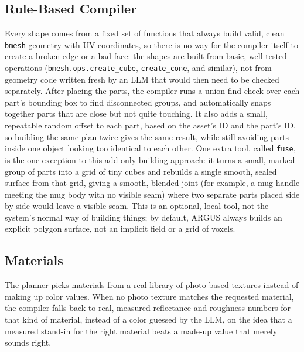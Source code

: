 \documentclass[conference]{IEEEtran}
\begin{document}
\subsection{Rule-Based Compiler}
Every shape comes from a fixed set of functions that always build valid, clean \texttt{bmesh} geometry with UV coordinates, so there is no way for the compiler itself to create a broken edge or a bad face: the shapes are built from basic, well-tested operations (\texttt{bmesh.ops.create\_cube}, \texttt{create\_cone}, and similar), not from geometry code written fresh by an LLM that would then need to be checked separately. After placing the parts, the compiler runs a union-find check over each part's bounding box to find disconnected groups, and automatically snaps together parts that are close but not quite touching. It also adds a small, repeatable random offset to each part, based on the asset's ID and the part's ID, so building the same plan twice gives the same result, while still avoiding parts inside one object looking too identical to each other. One extra tool, called \texttt{fuse}, is the one exception to this add-only building approach: it turns a small, marked group of parts into a grid of tiny cubes and rebuilds a single smooth, sealed surface from that grid, giving a smooth, blended joint (for example, a mug handle meeting the mug body with no visible seam) where two separate parts placed side by side would leave a visible seam. This is an optional, local tool, not the system's normal way of building things; by default, ARGUS always builds an explicit polygon surface, not an implicit field or a grid of voxels.

\subsection{Materials}
The planner picks materials from a real library of photo-based textures instead of making up color values. When no photo texture matches the requested material, the compiler falls back to real, measured reflectance and roughness numbers for that kind of material, instead of a color guessed by the LLM, on the idea that a measured stand-in for the right material beats a made-up value that merely sounds right.
\end{document}
